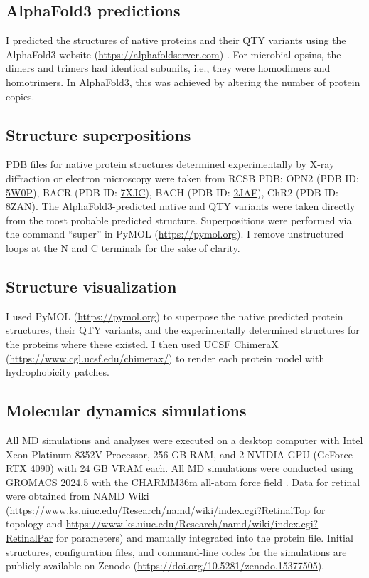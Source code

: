 \documentclass[fleqn, 10pt]{manuscript}
\begin{document}
\subsection*{AlphaFold3 predictions}

I predicted the structures of native proteins and their QTY variants using the AlphaFold3 website (\url{https://alphafoldserver.com}) \citep{Abramson_2024}. For microbial opsins, the dimers and trimers had identical subunits, i.e., they were homodimers and homotrimers. In AlphaFold3, this was achieved by altering the number of protein copies. 

\subsection*{Structure superpositions}

PDB files for native protein structures determined experimentally by X-ray diffraction or electron microscopy were taken from RCSB PDB: OPN2 (PDB ID: \href{https://www.rcsb.org/structure/5W0P}{5W0P}), BACR (PDB ID: \href{https://www.rcsb.org/structure/7XJC}{7XJC}), BACH (PDB ID: \href{https://www.rcsb.org/structure/2JAF}{2JAF}), ChR2 (PDB ID: \href{https://www.rcsb.org/structure/8ZAN}{8ZAN}). The AlphaFold3-predicted native and QTY variants were taken directly from the most probable predicted structure. Superpositions were performed via the command ``super'' in PyMOL (\url{https://pymol.org}). I remove unstructured loops at the N and C terminals for the sake of clarity. 

\subsection*{Structure visualization}

I used PyMOL (\url{https://pymol.org}) to superpose the native predicted protein structures, their QTY variants, and the experimentally determined structures for the proteins where these existed. I then used UCSF ChimeraX (\url{https://www.cgl.ucsf.edu/chimerax/}) to render each protein model with hydrophobicity patches.  

\subsection*{Molecular dynamics simulations}

All MD simulations and analyses were executed on a desktop computer with Intel Xeon Platinum 8352V Processor, 256 GB RAM, and 2 NVIDIA GPU (GeForce RTX 4090) with 24 GB VRAM each. All MD simulations were conducted using GROMACS 2024.5 \citep{Abraham_2015} with the CHARMM36m all-atom force field \citep{Huang_2017}. Data for retinal were obtained from NAMD Wiki (\url{https://www.ks.uiuc.edu/Research/namd/wiki/index.cgi?RetinalTop} for topology and \url{https://www.ks.uiuc.edu/Research/namd/wiki/index.cgi?RetinalPar} for parameters) and manually integrated into the protein file. Initial structures, configuration files, and command-line codes for the simulations are publicly available on Zenodo (\url{https://doi.org/10.5281/zenodo.15377505}). 
\end{document}
